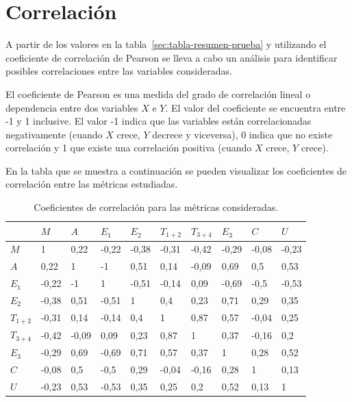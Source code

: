 \section{Correlaci\'on}

A partir de los valores en la tabla~\ref{sec:tabla-resumen-prueba} y utilizando el coeficiente de 
correlaci\'on de Pearson\cite{BoslaughStatistics2008} se lleva a cabo un an\'alisis  para identificar 
posibles correlaciones entre las variables consideradas. 

El coeficiente de Pearson es una medida del grado de correlaci\'on lineal o dependencia entre dos 
variables $X$ e $Y$. El valor del coeficiente se encuentra entre -1 y 1 inclusive. 
El valor -1 indica que las variables est\'an correlacionadas negativamente 
(cuando $X$ crece, $Y$ decrece y viceversa), 0 indica que no existe correlaci\'on y 1 que existe una 
correlaci\'on positiva (cuando $X$ crece, $Y$ crece).

En la tabla que se muestra a continuaci\'on se pueden visualizar los coeficientes de correlaci\'on entre las m\'etricas estudiadas.

\begin{table}[H] 
\centering
\footnotesize
\begin{tabular}{|p{1.2cm}|p{1.2cm}|p{1.2cm}|p{1.2cm}|p{1.2cm}|p{1.2cm}|p{1.2cm}|p{1.2cm}|p{1.2cm}|p{1.2cm}|}
\hline
& $M$ &  $A$  &   $E_1$ &  $E_2$  &  $T_{1+2}$  & $T_{3+4}$     & $E_3$ & $C$ & $U$ \\
\hline
$M$       &  1     &  0,22  & -0,22  & -0,38  &  -0,31  &  -0,42  &  -0,29 & -0,08    &  -0,23 \\
$A$       &  0,22  &  1  &  -1  &  0,51  &  0,14  &  -0,09  &  0,69  &  0,5           &  0,53 \\
$E_1$     &  -0,22 &  -1  &  1  &  -0,51  &  -0,14  &  0,09  &  -0,69  &  -0,5        &  -0,53 \\
$E_2$     &  -0,38 &  0,51  &  -0,51  &  1  &  0,4  &  0,23  &  0,71  &  0,29         &  0,35  \\
$T_{1+2}$ &  -0,31 &  0,14  &  -0,14  &  0,4  &  1  &  0,87  &  0,57  &  -0,04        &  0,25 \\
$T_{3+4}$ &  -0,42 &  -0,09  &  0,09  &  0,23  &  0,87  &  1  &  0,37  &  -0,16       &  0,2 \\
$E_3$     &  -0,29 &  0,69  &  -0,69  &  0,71  &  0,57  &  0,37  &  1  &  0,28        &  0,52 \\
$C$       &  -0,08 &  0,5  &  -0,5  &  0,29  &  -0,04  &  -0,16  &  0,28  &  1        &  0,13 \\
$U$       &  -0,23 &  0,53  &  -0,53  &  0,35  &  0,25  &  0,2  &  0,52  &  0,13      &  1 \\
\hline
\end{tabular}
\caption{Coeficientes de correlaci\'on para las m\'etricas consideradas.}
\label{sec:tabla-correlacion}
\end{table}

